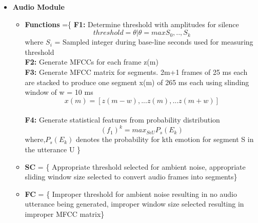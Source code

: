 \documentclass[oneside,a4paper,12pt]{report}
\begin{document}
\begin{normalsize}
\begin{itemize}
\begin{itemize}
	\begin{itemize}
		\item \textbf{Audio Module}\\
		\begin{itemize}
			\item \textbf{Functions} =\newline  \{  \textbf{F1:} Determine threshold with amplitudes for silence \\ \begin{equation}
			threshold = \theta | \theta = max{S_0, .. ,S_k} \end{equation} where \(S_i\) = Sampled integer during base-line seconds used for measuring threshold\newline \\ \textbf{F2:} Generate MFCCs for each frame z(m)\\ \textbf{F3:} Generate MFCC matrix for segments. 2m+1 frames of 25 ms each are stacked to produce one segment x(m) of 265 ms each using slinding window of w = 10 ms \\ \begin{equation}
			x(m) = [z(m-w), ... z(m), ... z(m+w)]
			\end{equation} \newline\\ \textbf{F4:} Generate statistical features from probability distribution \\ \begin{equation}
			(f_1)^k = max_{S \epsilon U} P_s(E_k)
			\end{equation} where,\newline \(P_s(E_k)\) denotes the probability for kth emotion for segment S in the utterance U \}\newline
			
			
			\item \textbf{SC} = \{ Appropriate threshold selected for ambient noise, appropriate sliding window size selected to convert
			 audio frames into segments\}\newline
			 
			 
			\item \textbf{FC} = \{ Improper threshold for ambient noise resulting in no audio utterance being generated, improper window size selected resulting in improper MFCC matrix\} \\
		\end{itemize}
		\vspace{4mm}
		

\end{itemize}
\end{itemize}
\end{itemize}
\end{normalsize}
\end{document}
